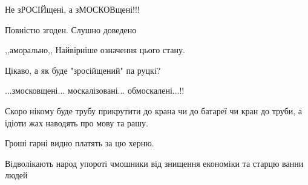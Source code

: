 \begin{itemize}
 
Не зРОСІЙщені, а зМОСКОВщені!!!

 
Повністю згоден.
Слушно доведено

 
,,аморально,,
Найвірніше означення цього стану.

 
Цікаво, а як буде "зросійщений" па руцкі?

 
...змосковщені... москалізовані... обмоскалені...!!

 

Скоро нікому буде трубу прикрутити до крана чи до батареї чи кран до труби, а
ідіоти жах наводять про мову та рашу.

Гроші гарні видно платять за цю херню.

Відволікають народ упороті чмошники від знищення економіки та старцю ванни
людей

\begin{itemize}
 

\end{itemize}
\end{itemize}
